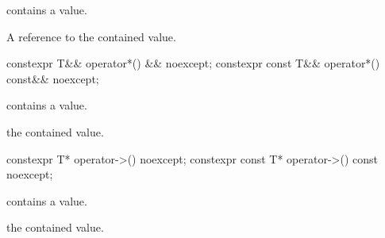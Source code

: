 \begin{itemdescr}
\pnum
\expects
{} contains a value.

\pnum
\returns
A reference to the contained value.
\end{itemdescr}

%
\begin{itemdecl}
constexpr T&& operator*() && noexcept;
constexpr const T&& operator*() const&& noexcept;
\end{itemdecl}

\begin{itemdescr}
\pnum
\expects
{} contains a value.

\pnum
\returns
{}the contained value\tcode{)}.
\end{itemdescr}

%
\begin{itemdecl}
constexpr T* operator->() noexcept;
constexpr const T* operator->() const noexcept;
\end{itemdecl}

\begin{itemdescr}
\pnum
\expects
{} contains a value.

\pnum
\returns
{}the contained value\tcode{)}.
\end{itemdescr}
